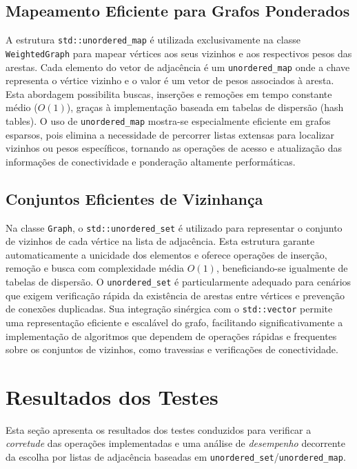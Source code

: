 \documentclass{sbc2023}%
\begin{document}
\subsection{Mapeamento Eficiente para Grafos Ponderados}

A estrutura \texttt{std::unordered\_map} é utilizada exclusivamente na classe \texttt{WeightedGraph} para mapear vértices aos seus vizinhos e aos respectivos pesos das arestas. Cada elemento do vetor de adjacência é um \texttt{unordered\_map} onde a chave representa o vértice vizinho e o valor é um vetor de pesos associados à aresta. Esta abordagem possibilita buscas, inserções e remoções em tempo constante médio (\(O(1)\)), graças à implementação baseada em tabelas de dispersão (hash tables). O uso de \texttt{unordered\_map} mostra-se especialmente eficiente em grafos esparsos, pois elimina a necessidade de percorrer listas extensas para localizar vizinhos ou pesos específicos, tornando as operações de acesso e atualização das informações de conectividade e ponderação altamente performáticas.

\subsection{Conjuntos Eficientes de Vizinhança}

Na classe \texttt{Graph}, o \texttt{std::unordered\_set} é utilizado para representar o conjunto de vizinhos de cada vértice na lista de adjacência. Esta estrutura garante automaticamente a unicidade dos elementos e oferece operações de inserção, remoção e busca com complexidade média \(O(1)\), beneficiando-se igualmente de tabelas de dispersão. O \texttt{unordered\_set} é particularmente adequado para cenários que exigem verificação rápida da existência de arestas entre vértices e prevenção de conexões duplicadas. Sua integração sinérgica com o \texttt{std::vector} permite uma representação eficiente e escalável do grafo, facilitando significativamente a implementação de algoritmos que dependem de operações rápidas e frequentes sobre os conjuntos de vizinhos, como travessias e verificações de conectividade.

\section{Resultados dos Testes}
\label{sec:results}

Esta seção apresenta os resultados dos testes conduzidos para verificar a
\textit{corretude} das operações implementadas e uma análise de
\textit{desempenho} decorrente da escolha por listas de adjacência baseadas em \texttt{unordered\_set}/\texttt{unordered\_map}.
\end{document}
